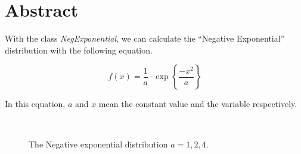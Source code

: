 %

\section{Abstract}

\noindent
With the class {\em NegExponential}, we can calculate the ``Negative
Exponential'' distribution with the following equation.

\begin{equation}
f(x) = \frac{1}{a} \cdot \exp\left\{\frac{-x^2}{a}\right\}
\end{equation}

\noindent
In this equation, $a$ and $x$ mean the constant value and the variable respectively.

\vspace*{10mm}

\begin{center}
\begin{figure}[h]
\\
\caption{The Negative exponential distribution $a=1,2,4$.}
\end{figure}
\end{center}

